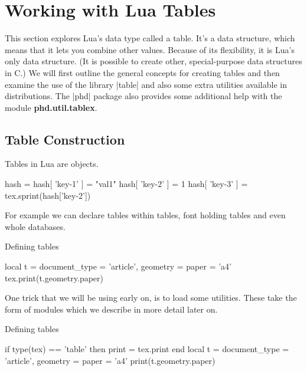 \chapter{Working with Lua Tables}

This section explores Lua's data type called a table. It's a data structure, which means that it lets
you combine other values. Because of its flexibility, it is Lua’s only data structure. (It is possible to
create other, special-purpose data structures in C.) We will first outline the general concepts for creating tables and then examine the use of the library |table| and also some extra utilities available in distributions. The |phd| package also provides some additional help with the module \textbf{phd.util.tablex}.

\section{Table Construction}

Tables in Lua are objects. 

\begin{texexample}{}{}
\begin{luacode}
hash = {}
hash[ 'key-1' ] = "val1"
hash[ 'key-2' ] = 1
hash[ 'key-3' ] = {}
tex.sprint(hash['key-2'])
\end{luacode}
\end{texexample}

For example we can declare tables within tables, font holding tables and even whole databases.

\begin{texexample}{Defining tables}{}
\begin{luacode}
local t = {
    document_type = {'article'},
    geometry = {
       paper = 'a4'
     }
} 
tex.print(t.geometry.paper)
\end{luacode}
\end{texexample}

One trick that we will be using early on, is to load some utilities. These take the form of modules which we describe in more detail later on. 

\begin{texexample}{Defining tables}{}
\begin{luacode}
if type(tex) == 'table' then print = tex.print end
local t = {
    document_type = {'article'},
    geometry = {
       paper = 'a4'
     }
} 
print(t.geometry.paper)
\end{luacode}
\end{texexample}

